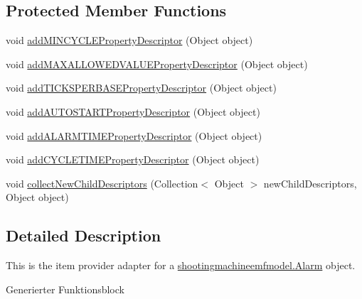 \subsection*{Protected Member Functions}
\begin{DoxyCompactItemize}
\item 
void \hyperlink{classshootingmachineemfmodel_1_1provider_1_1_alarm_item_provider_aaf555dc3272fb58cc6e915327262d617}{add\-M\-I\-N\-C\-Y\-C\-L\-E\-Property\-Descriptor} (Object object)
\item 
void \hyperlink{classshootingmachineemfmodel_1_1provider_1_1_alarm_item_provider_a0eefa3fa0f15939443a834ef47b8a153}{add\-M\-A\-X\-A\-L\-L\-O\-W\-E\-D\-V\-A\-L\-U\-E\-Property\-Descriptor} (Object object)
\item 
void \hyperlink{classshootingmachineemfmodel_1_1provider_1_1_alarm_item_provider_a6aab361c9827e9912f2e3939d3582bc6}{add\-T\-I\-C\-K\-S\-P\-E\-R\-B\-A\-S\-E\-Property\-Descriptor} (Object object)
\item 
void \hyperlink{classshootingmachineemfmodel_1_1provider_1_1_alarm_item_provider_a13f395148ac5128dc969563e33051ffd}{add\-A\-U\-T\-O\-S\-T\-A\-R\-T\-Property\-Descriptor} (Object object)
\item 
void \hyperlink{classshootingmachineemfmodel_1_1provider_1_1_alarm_item_provider_a0f73dcc920ceccb55c5ec3a2bd076154}{add\-A\-L\-A\-R\-M\-T\-I\-M\-E\-Property\-Descriptor} (Object object)
\item 
void \hyperlink{classshootingmachineemfmodel_1_1provider_1_1_alarm_item_provider_ad43a9f0d0fd6c98932e8e9fe631940dd}{add\-C\-Y\-C\-L\-E\-T\-I\-M\-E\-Property\-Descriptor} (Object object)
\item 
void \hyperlink{classshootingmachineemfmodel_1_1provider_1_1_alarm_item_provider_a61b2b6017eabc99ac8ab37497640ceaa}{collect\-New\-Child\-Descriptors} (Collection$<$ Object $>$ new\-Child\-Descriptors, Object object)
\end{DoxyCompactItemize}


\subsection{Detailed Description}
This is the item provider adapter for a \hyperlink{interfaceshootingmachineemfmodel_1_1_alarm}{shootingmachineemfmodel.\-Alarm} object.

Generierter Funktionsblock 

